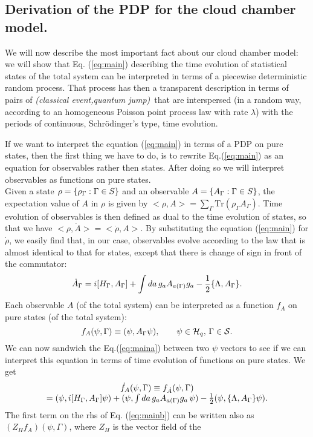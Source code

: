 \documentclass[12pt]{article}
\def\be{\begin{equation}}
\def\ee{\end{equation}}
\def\ba{\begin{array}}
\def\ea{\end{array}}
\def\tr{\mbox{Tr}}
\begin{document}
\subsection{Derivation of the PDP for the cloud chamber model.}
We will now describe the most important fact about our cloud chamber
model: we will show that Eq. (\ref{eq:main}) describing the time
evolution of statistical states of the total system can be interpreted
in terms of a piecewise deterministic random process. That process has
then a transparent description in terms of pairs of
{\sl (classical event,quantum jump)}\, that are interspersed (in a random
way, according to an homogeneous Poisson point process law with rate
$\lambda$) with the periods of continuous, Schr\"odinger's type, time
evolution.


If we want to interpret the equation (\ref{eq:main}) in terms of a PDP on
pure states, then the first thing we have to do, is to rewrite
Eq.(\ref{eq:main}) as an equation for observables rather then states. After
doing so we will interpret observables as functions on pure states.\\ Given
a state $\rho=\{\rho_\Gamma:\Gamma\in{\sl S}\}$ and an observable
$A=\{A_\Gamma:\Gamma\in{\sl S}\}$, the expectation value of $A$ in $\rho$
is given by $<\rho,A>=\sum_\Gamma \tr (\rho_\Gamma A_\Gamma)$. Time
evolution of observables is then defined as dual to the time evolution of
states, so that we have $<\rho,\dot A>=<{\dot \rho},A>$. By substituting
the equation (\ref{eq:main}) for ${\dot \rho}$, we easily find that, in our
case, observables evolve according to the law that is almost identical to
that for states, except that there is change of sign in front of the
commutator: \be {\dot A}_\Gamma=i[H_\Gamma,A_\Gamma]+\int da\, g_a
A_{a(\Gamma)}g_a - {1\over2}\{\Lambda,A_\Gamma\} .\label{eq:maina} \ee Each
observable $A$ (of the total system) can be interpreted as a function $f_A$
on pure states (of the total system): \be
f_A(\psi,\Gamma)\equiv(\psi,A_\Gamma\psi),\qquad \psi\in {\cal H}_q,\,
\Gamma\in {\cal S}. \ee We can now sandwich the Eq.(\ref{eq:maina}) between
two $\psi$ vectors to see if we can interpret this equation in terms of
time evolution of functions on pure states. We get \be \ba{cc} {\dot
f}_A(\psi,\Gamma)\equiv f_{\dot A}(\psi,\Gamma)\\
=(\psi,i[H_\Gamma,A_\Gamma]\psi) +(\psi,\int da\, g_a A_{a(\Gamma)}g_a\,
\psi)-{1\over 2}(\psi,\{\Lambda, A_\Gamma \} \psi ). \ea\label{eq:mainb}
\ee The first term on the rhs of Eq. (\ref{eq:mainb}) can be written also
as $(Z_H f_A)(\psi,\Gamma)$, where $Z_H$ is the vector field of the
\end{document}
